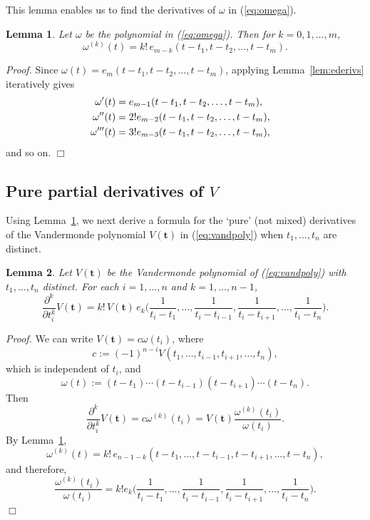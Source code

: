 \documentclass[12pt]{article}
\def\bft{\mathbf{t}}
\newtheorem{lemma}{Lemma}
\newenvironment{proof}{\begin{trivlist}\item[]{\emph{Proof.}}}
               {\hfill$\Box$\end{trivlist}}
\begin{document}
This lemma enables us to find the derivatives of $\omega$ in (\ref{eq:omega}).
\begin{lemma}\label{lem:pderivs}
Let $\omega$ be the polynomial in (\ref{eq:omega}). Then
for $k=0,1,\ldots,m$,
$$ \omega^{(k)}(t) = k! \, e_{m-k}(t-t_1,t-t_2,\ldots,t-t_m).  $$
\end{lemma}

\begin{proof}
Since $\omega(t) = e_m(t-t_1,t-t_2,\ldots,t-t_m)$,
applying Lemma~\ref{lem:ederivs} iteratively gives
\begin{align*}
\omega'(t) &= e_{m-1}(t-t_1,t-t_2,\ldots,t-t_m), \cr
\omega''(t) &= 2! e_{m-2}(t-t_1,t-t_2,\ldots,t-t_m), \cr
\omega'''(t) &= 3! e_{m-3}(t-t_1,t-t_2,\ldots,t-t_m),
\end{align*}
and so on.
\end{proof}

\subsection{Pure partial derivatives of $V$}
Using Lemma~\ref{lem:pderivs},
we next derive a formula for the `pure' (not mixed) derivatives
of the Vandermonde polynomial $V(\bft)$ in (\ref{eq:vandpoly})
when $t_1,\ldots,t_n$ are distinct.
\begin{lemma}\label{lem:Vderivs}
Let $V(\bft)$ be the Vandermonde polynomial
of (\ref{eq:vandpoly}) with $t_1,\ldots,t_n$ distinct.
For each $i=1,\ldots,n$ and $k=1,\ldots,n-1$,
$$
\frac{\partial^k}{\partial t_i^k} V(\bft)
= k! \, V(\bft) \,
e_k\Big(\frac{1}{t_i-t_1},\ldots,\frac{1}{t_i-t_{i-1}},
	\frac{1}{t_i-t_{i+1}},\ldots,\frac{1}{t_i-t_n}\Big).
$$
\end{lemma}

\begin{proof}
We can write $V(\bft) = c \omega(t_i)$, where
$$
c := (-1)^{n-i} V(t_1,\ldots,t_{i-1},t_{i+1},\ldots,t_n),
$$
which is independent of $t_i$, and
$$ \omega(t) := (t-t_1) \cdots (t-t_{i-1})
(t-t_{i+1}) \cdots (t-t_n). $$
Then
$$
\frac{\partial^k}{\partial t_i^k} V(\bft)
	= c \omega^{(k)}(t_i)
	= V(\bft) \frac{\omega^{(k)}(t_i)}{\omega(t_i)}.
$$
By Lemma~\ref{lem:pderivs},
$$
\omega^{(k)}(t) = k! \, 
e_{n-1-k}(t-t_1,\ldots,t-t_{i-1},t-t_{i+1},\ldots,t-t_n),
$$
and therefore,
$$
\frac{\omega^{(k)}(t_i)}{\omega(t_i)}
= k!
e_k\Big(\frac{1}{t_i-t_1},\ldots,\frac{1}{t_i-t_{i-1}},
	\frac{1}{t_i-t_{i+1}},\ldots,\frac{1}{t_i-t_n}\Big).
$$
\end{proof}
\end{document}
